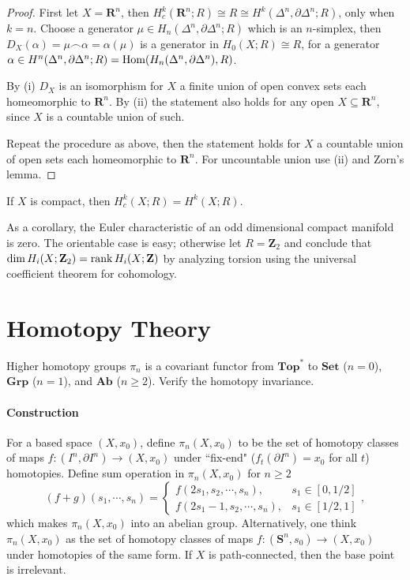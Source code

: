 \documentclass[11pt]{article}
\theoremstyle{definition}
\theoremstyle{plain}
\newcommand{\R}{\mathbf{R}}
\newcommand{\Z}{\mathbf{Z}}
\newcommand{\Hom}{\textup{Hom}}
\newcommand{\1}{\mathbf{1}}
\newcommand{\s}{\mathbf{S}}
\begin{document}
\begin{proof}
First let $X=\R^n$, then $H_c^k(\R^n;R)\cong R\cong H^k(\Delta^n,\partial\Delta^n;R)$, only when $k=n$. Choose a generator $\mu\in H_n(\Delta^n,\partial\Delta^n;R)$ which is an $n$-simplex, then $D_X(\alpha)=\mu\frown\alpha=\alpha(\mu)$ is a generator in $H_0(X;R)\cong R$, for a generator $\alpha\in H^n(\Delta^n,\partial\Delta^n;R)=\Hom(H_n(\Delta^n,\partial\Delta^n),R)$.\medbreak

By (i) $D_X$ is an isomorphism for $X$ a finite union of open convex sets each homeomorphic to $\R^n$. By (ii) the statement also holds for any open $X\subseteq\R^n$, since $X$ is a countable union of such.\medbreak

Repeat the procedure as above, then the statement holds for $X$ a countable union of open sets each homeomorphic to $\R^n$. For uncountable union use (ii) and Zorn's lemma. 
\end{proof}

If $X$ is compact, then $H_c^k(X;R)=H^k(X;R)$.\medbreak

As a corollary, the Euler characteristic of an odd dimensional compact manifold is zero. The orientable case is easy; otherwise let $R=\Z_2$ and conclude that $\dim H_i(X;\Z_2)=\rank H_i(X;\Z)$ by analyzing torsion using the universal coefficient theorem for cohomology.

\newpage
\section{Homotopy Theory}

Higher homotopy groups $\pi_n$ is a covariant functor from $\textbf{Top}^\ast$ to $\textbf{Set}$ ($n=0$), $\textbf{Grp}$ ($n=1$), and $\textbf{Ab}$ ($n\geq2$). Verify the homotopy invariance.

\paragraph{Construction} For a based space $(X,x_0)$, define $\pi_n(X,x_0)$ to be the set of homotopy classes of maps $f:(I^n,\partial I^n)\to(X,x_0)$ under ``fix-end" ($f_t(\partial I^n)=x_0$ for all $t$) homotopies. Define sum operation in $\pi_n(X,x_0)$ for $n\geq2$
\[(f+g)(s_1,\cdots,s_n)=\begin{cases}
f(2s_1,s_2,\cdots,s_n),&s_1\in[0,1/2]\\f(2s_1-1,s_2,\cdots,s_n),&s_1\in[1/2,1]
\end{cases},\]
which makes $\pi_n(X,x_0)$ into an abelian group. Alternatively, one think $\pi_n(X,x_0)$ as the set of homotopy classes of maps $f:(\s^n,s_0)\to(X,x_0)$ under homotopies of the same form. If $X$ is path-connected, then the base point is irrelevant.
\end{document}
